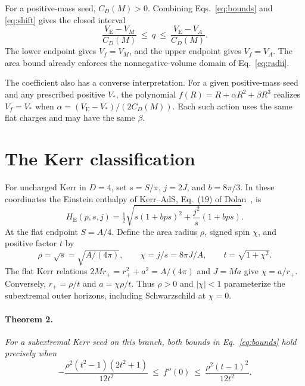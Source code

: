 \documentclass[11pt,a4paper]{article}
\newcommand{\VE}{V_{\mathrm E}}
\newcommand{\HE}{H_{\mathrm E}}
\begin{document}
For a positive-mass seed, \(C_D(M)>0\). Combining Eqs.~\eqref{eq:bounds} and \eqref{eq:shift} gives the closed interval
\begin{equation}\label{eq:general}
 \frac{\VE-V_M}{C_D(M)}\ \leq\ q\ \leq\ \frac{\VE-V_A}{C_D(M)} .
\end{equation}
The lower endpoint gives \(V_f=V_M\), and the upper endpoint gives \(V_f=V_A\). The area bound already enforces the nonnegative-volume domain of Eq.~\eqref{eq:radii}.

The coefficient also has a converse interpretation. For a given positive-mass seed and any prescribed positive \(V_*\), the polynomial \(f(R)=R+\alpha R^2+\beta R^3\) realizes \(V_f=V_*\) when \(\alpha=(\VE-V_*)/(2C_D(M))\). Each such action uses the same flat charges and may have the same \(\beta\).

\newpage
\section{The Kerr classification}\label{sec:kerr}
For uncharged Kerr in \(D=4\), set \(s=S/\pi\), \(j=2J\), and \(b=8\pi/3\). In these coordinates the Einstein enthalpy of Kerr--AdS, Eq.~(19) of Dolan~\cite{dolan}, is
\begin{equation}\label{eq:dolan}
 \HE(p,s,j)=\tfrac12\sqrt{s(1+bps)^2+\frac{j^2}{s}(1+bps)} .
\end{equation}
At the flat endpoint \(S=A/4\). Define the area radius \(\rho\), signed spin \(\chi\), and positive factor \(t\) by
\begin{equation}\label{eq:spin}
 \rho=\sqrt{s}=\sqrt{A/(4\pi)},\qquad
 \chi=j/s=8\pi J/A,\qquad t=\sqrt{1+\chi^2}.
\end{equation}
The flat Kerr relations \(2Mr_+=r_+^2+a^2=A/(4\pi)\) and \(J=Ma\) give \(\chi=a/r_+\). Conversely, \(r_+=\rho/t\) and \(a=\chi\rho/t\). Thus \(\rho>0\) and \(|\chi|<1\) parameterize the subextremal outer horizons, including Schwarzschild at \(\chi=0\).

\paragraph{Theorem 2.}
\emph{For a subextremal Kerr seed on this branch, both bounds in Eq.~\eqref{eq:bounds} hold precisely when}
\begin{equation}\label{eq:kerr}
 \boxed{\displaystyle
 -\frac{\rho^2(t^2-1)(2t^2+1)}{12t^2}
 \ \leq\ f''(0)\ \leq\
 \frac{\rho^2(t-1)^2}{12t^2}.}
\end{equation}
\end{document}
